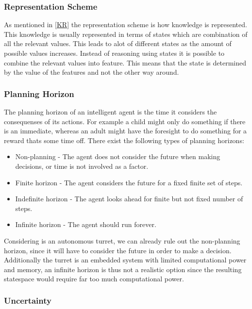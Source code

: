 \subsubsection{Representation Scheme}
As mentioned in \autoref{KR} the representation scheme is how knowledge is
represented. This knowledge is usually represented in terms of states which are
combination of all the relevant values. This leads to alot of different states
as the amount of possible values increases. Instead of reasoning using states it
is possible to combine the relevant values into feature. This means that the
state is determined by the value of the features and not the other way around.

\subsubsection{Planning Horizon}
The planning horizon of an intelligent agent is the time it considers the
consequenses of its actions. For example a child might only do something if
there is an immediate, whereas an adult might have the foresight to do something
for a reward thats some time off. There exist the following types of planning
horizons:
\begin{itemize}
	\item Non-planning - The agent does not consider the future when making
	decisions, or time is not involved as a factor.
	\item Finite horizon - The agent considers the future for a fixed finite set
	of steps. 
	\item Indefinite horizon - The agent looks ahead for finite but not fixed
	number of steps.
	\item Infinite horizon - The agent should run forever.	
\end{itemize}

Considering \name is an autonomous turret, we can already rule out the
non-planning horizon, since it will have to consider the future in order to
make a decision. Additionally the turret is an embedded system with limited
computational power and memory, an infinite horizon is thus not a realistic
option since the resulting statespace would require far too much computational
power.

\subsubsection{Uncertainty}

